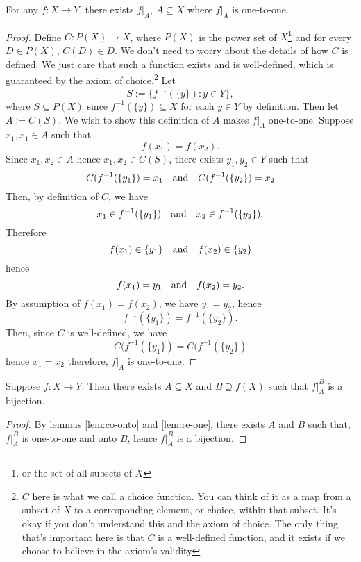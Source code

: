 \begin{lemma}
For any $f:X\to Y$, there exists $f|_A$, $A\subseteq X$	where $f|_A$ is one-to-one.
\label{lem:re-one}
\end{lemma}
\begin{proof}
	Define $C:P(X)\to X$, where $P(X)$ is the power set of $X$\footnote{or the set of all subsets of $X$} and for every $D\in P(X)$, $C(D)\in D.$
	We don't need to worry about the details of how $C$ is defined.
	We just care that such a function exists and is well-defined, which is guaranteed by the axiom of choice.\footnote{
	$C$ here is what we call a choice function. You can think of it as a map from a subset of $X$ to a corresponding element, or choice, within that subset.
	It's okay if you don't understand this and the axiom of choice. The only thing that's important here is that $C$ is a well-defined function, and it exists if we choose to believe in the axiom's validity}
	Let
	$$S:=\{f^{-1}(\{y\}):y\in Y\},$$
	where $S\subseteq P(X)$ since $f^{-1}(\{y\})\subseteq X$ for each $y\in Y$ by definition.
	Then let ${A:=C(S)}$.
	We wish to show this definition of $A$ makes $f|_A$ one-to-one.
	Suppose $x_1,x_1\in A$ such that
	$$f(x_1)=f(x_2).$$
	Since $x_1,x_2\in A$ hence $x_1,x_2\in C(S)$, there exists $y_1,y_2\in Y$ such that
	$$C(f^{-1}(\{y_1\})=x_1 \quad\text{and}\quad C(f^{-1}(\{y_2\})=x_2$$
	Then, by definition of $C$, we have
	$$x_1\in f^{-1}(\{y_1\}) \quad\text{and}\quad x_2\in f^{-1}(\{y_2\}).$$
	Therefore
	$$f(x_1)\in \{y_1\} \quad\text{and}\quad f(x_2)\in \{y_2\}$$
	hence
	$$f(x_1)=y_1 \quad\text{and}\quad f(x_2)=y_2.$$
	By assumption of $f(x_1)=f(x_2)$, we have $y_1=y_2$, hence
	$$f^{-1}(\{y_1\})=f^{-1}(\{y_2\}).$$
	Then, since $C$ is well-defined, we have 
	$$C(f^{-1}(\{y_1\})=C(f^{-1}(\{y_2\})$$
	hence $x_1=x_2$ therefore, $f|_A$ is one-to-one.
\end{proof}

\begin{theorem}
	Suppose $f:X\to Y$. Then there exists $A\subseteq X$ and $B\supseteq f(X)$ such that $f|^B_A$ is a bijection.
	\label{thm:to-bi}
\end{theorem}
\begin{proof}
	By lemmas \eqref{lem:co-onto} and \eqref{lem:re-one}, there exists $A$ and $B$ such that, $f|^B_A$ is one-to-one and onto $B$, hence $f|^B_A$ is a bijection.
\end{proof}

